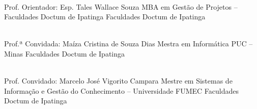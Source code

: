 \vspace{.7cm}
\begin{flushleft}
\parbox{12cm}{

\singlespacing

\hrulefill \\

\vspace{-.4cm}
Prof. Orientador: Esp. Tales Wallace Souza
\newline
MBA em Gestão de Projetos – Faculdades Doctum de Ipatinga
\newline
Faculdades Doctum de Ipatinga
\vspace{.7cm}

\hrulefill \\

\vspace{-.4cm}
Prof.ª Convidada: Maíza Cristina de Souza Dias 
\newline
Mestra em Informática PUC – Minas
\newline
Faculdades Doctum de Ipatinga
\vspace{.7cm}

\hrulefill \\

\vspace{-.4cm}
Prof. Convidado: Marcelo José Vigorito Campara
\newline
Mestre em Sistemas de Informação e Gestão do Conhecimento – Universidade FUMEC
\newline
Faculdades Doctum de Ipatinga
\vspace{.7cm}

}
\end{flushleft}
\vfill


\begin{comment}
\begin{center}
Rio de Janeiro\linebreak 2012
\end{center}
\end{comment}